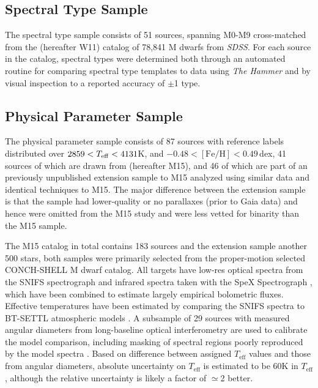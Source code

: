 \documentclass[twocolumn]{aastex62}
\newcommand{\sdss}{\textsl{SDSS}}
\newcommand{\teff}{T_{\mathrm{eff}}}
\newcommand{\feh}{[{\mathrm{Fe}/\mathrm{H}}]}
\begin{document}
\subsection{Spectral Type Sample}

The spectral type sample consists of 51 sources, spanning M0-M9 cross-matched from the \citealt{West:2011} (hereafter W11) catalog of 78,841 M dwarfs from \sdss. For each source in the catalog, spectral types were determined both through an automated routine for comparing spectral type templates to data using \textsl{The Hammer} \citep{Covey:2007} and by visual inspection to a reported accuracy of $\pm$1 type.

\subsection{Physical Parameter Sample}

The physical parameter sample consists of 87 sources with reference labels distributed over $2859 <T_{\rm eff} < 4131$K, and $-0.48 < \feh < 0.49$\,dex, 41 sources of which are drawn from \citealt{Mann:2015} (hereafter M15), and 46 of which are part of an previously unpublished extension sample to M15 analyzed using similar data and identical techniques to M15. The major difference between the extension sample is that the sample had lower-quality or no parallaxes (prior to Gaia data) and hence were omitted from the M15 study and were less vetted for binarity than the M15 sample.

The M15 catalog in total contains 183 sources and the extension sample another 500 stars, both samples were primarily selected from the proper-motion selected CONCH-SHELL \citep{Gaidos:2013} M dwarf catalog. All targets have low-res optical spectra from the SNIFS spectrograph \citep{Lantz:2004} and infrared spectra taken with the SpeX Spectrograph \citep{Rayner:2003}, which have been combined to estimate largely empirical bolometric fluxes. Effective temperatures have been estimated by comparing the SNIFS spectra to BT-SETTL atmospheric models \citep{Allard:2011}. A subsample of 29 sources with measured angular diameters from long-baseline optical interferometry \citep{Boyajian:2012} are used to calibrate the model comparison, including masking of spectral regions poorly reproduced by the model spectra \citep{Mann:2013c}. Based on difference between assigned $\teff$ values and those from angular diameters, absolute uncertainty on $\teff$ is estimated to be 60K in $\teff$, although the relative uncertainty is likely a factor of $\simeq$2 better.
\end{document}
